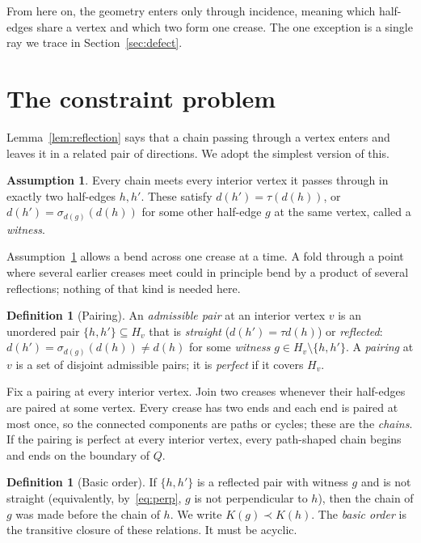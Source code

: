 \documentclass[11pt]{article}
\theoremstyle{definition}
\newtheorem{definition}[theorem]{Definition}
\newtheorem{assumption}[theorem]{Assumption}
\theoremstyle{remark}
\begin{document}
From here on, the geometry enters only through incidence, meaning which half-edges share a vertex and which two form one crease. The one exception is a single ray we trace in Section~\ref{sec:defect}.

\section{The constraint problem}\label{sec:csp}

Lemma~\ref{lem:reflection} says that a chain passing through a vertex enters and leaves it in a related pair of directions. We adopt the simplest version of this.

\begin{assumption}\label{ass:pairs}
Every chain meets every interior vertex it passes through in exactly two half-edges $h,h'$. These satisfy $d(h')=\tau(d(h))$, or $d(h')=\sigma_{d(g)}(d(h))$ for some other half-edge $g$ at the same vertex, called a \emph{witness}.
\end{assumption}

Assumption~\ref{ass:pairs} allows a bend across one crease at a time. A fold through a point where several earlier creases meet could in principle bend by a product of several reflections; nothing of that kind is needed here.

\begin{definition}[Pairing]
An \emph{admissible pair} at an interior vertex $v$ is an unordered pair $\{h,h'\}\subseteq H_v$ that is \emph{straight} ($d(h')=\tau d(h)$) or \emph{reflected}: $d(h')=\sigma_{d(g)}(d(h))\neq d(h)$ for some \emph{witness} $g\in H_v\setminus\{h,h'\}$. A \emph{pairing} at $v$ is a set of disjoint admissible pairs; it is \emph{perfect} if it covers $H_v$.
\end{definition}

Fix a pairing at every interior vertex. Join two creases whenever their half-edges are paired at some vertex. Every crease has two ends and each end is paired at most once, so the connected components are paths or cycles; these are the \emph{chains}. If the pairing is perfect at every interior vertex, every path-shaped chain begins and ends on the boundary of $Q$.

\begin{definition}[Basic order]
If $\{h,h'\}$ is a reflected pair with witness $g$ and is not straight (equivalently, by~\eqref{eq:perp}, $g$ is not perpendicular to $h$), then the chain of $g$ was made before the chain of $h$. We write $K(g)\prec K(h)$. The \emph{basic order} is the transitive closure of these relations. It must be acyclic.
\end{definition}
\end{document}
